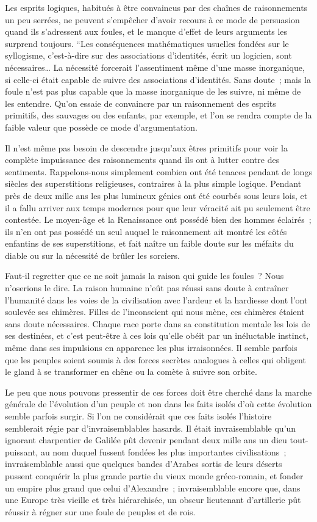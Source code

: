 \documentclass[french,twoside]{book} %
\begin{document}
Les esprits logiques, habitués à être convaincus par des chaînes de raisonnements un peu serrées, ne peuvent s’empêcher d’avoir recours à ce mode de persuasion quand ils s’adressent aux foules, et le manque d’effet de leurs arguments les surprend toujours. “Les conséquences mathématiques usuelles fondées sur le syllogisme, c’est-à-dire sur des associations d’identités, écrit un logicien, sont nécessaires… La néces­sité forcerait l’assentiment même d’une masse inorganique, si celle-ci était capable de suivre des associations d’identités. Sans doute ; mais la foule n’est pas plus capable que la masse inorganique de les suivre, ni même de les entendre. Qu’on essaie de convaincre par un raisonnement des esprits primitifs, des sauvages ou des enfants, par exemple, et l’on se rendra compte de la faible valeur que possède ce mode d’argu­mentation.\par
Il n’est même pas besoin de descendre jusqu’aux êtres primitifs pour voir la complète impuissance des raisonnements quand ils ont à lutter contre des sentiments. Rappelons-nous simplement combien ont été tenaces pendant de longs siècles des superstitions religieuses, contraires à la plus simple logique. Pendant près de deux mille ans les plus lumineux génies ont été courbés sous leurs lois, et il a fallu arriver aux temps modernes pour que leur véracité ait pu seulement être contestée. Le moyen-âge et la Renaissance ont possédé bien des hommes éclairés ; ils n’en ont pas possédé un seul auquel le raisonnement ait montré les côtés enfantins de ses supers­titions, et fait naître un faible doute sur les méfaits du diable ou sur la nécessité de brûler les sorciers.\par
Faut-il regretter que ce ne soit jamais la raison qui guide les foules ? Nous n’oserions le dire. La raison humaine n’eût pas réussi sans doute à entraîner l’huma­nité dans les voies de la civilisation avec l’ardeur et la hardiesse dont l’ont soulevée ses chimères. Filles de l’inconscient qui nous mène, ces chimères étaient sans doute nécessaires. Chaque race porte dans sa constitution mentale les lois de ses destinées, et c’est peut-être à ces lois qu’elle obéit par un inéluctable instinct, même dans ses impulsions en apparence les plus irraisonnées. Il semble parfois que les peuples soient sou­mis à des forces secrètes analogues à celles qui obligent le gland à se transformer en chêne ou la comète à suivre son orbite.\par
Le peu que nous pouvons pressentir de ces forces doit être cherché dans la marche générale de l’évolution d’un peuple et non dans les faits isolés d’où cette évolution semble parfois surgir. Si l’on ne considérait que ces faits isolés l’histoire semblerait régie par d’invraisemblables hasards. Il était invraisemblable qu’un ignorant char­pentier de Galilée pût devenir pendant deux mille ans un dieu tout-puissant, au nom duquel fussent fondées les plus importantes civilisations ; invraisemblable aussi que quelques bandes d’Arabes sortis de leurs déserts pussent conquérir la plus grande partie du vieux monde gréco-romain, et fonder un empire plus grand que celui d’Alexandre ; invraisemblable encore que, dans une Europe très vieille et très hiérar­chisée, un obscur lieutenant d’artillerie pût réussir à régner sur une foule de peuples et de rois.\par
\end{document}
